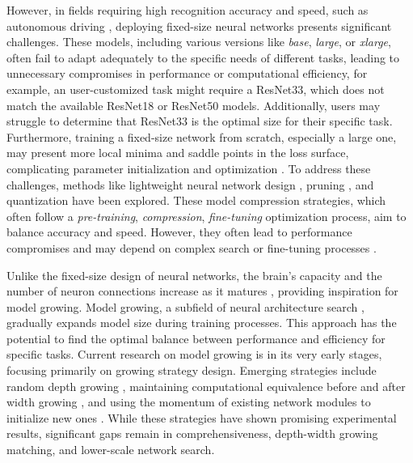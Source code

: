 \documentclass[preprint,12pt]{elsarticle}
\begin{document}
However, in fields requiring high recognition accuracy and speed, such as autonomous driving \cite{autodrive}, deploying fixed-size neural networks presents significant challenges. These models, including various versions like \textit{base}, \textit{large}, or \textit{xlarge}, often fail to adapt adequately to the specific needs of different tasks, leading to unnecessary compromises in performance or computational efficiency, for example, an user-customized task might require a ResNet33, which does not match the available ResNet18 or ResNet50 models. Additionally, users may struggle to determine that ResNet33 is the optimal size for their specific task. Furthermore, training a fixed-size network from scratch, especially a large one, may present more local minima and saddle points in the loss surface, complicating parameter initialization and optimization \cite{hardtrain}. To address these challenges, methods like lightweight neural network design \cite{lightweight}, pruning \cite{pruning}, and quantization \cite{quantization} have been explored. These model compression strategies, which often follow a \textit{pre-training}, \textit{compression}, \textit{fine-tuning} optimization process, aim to balance accuracy and speed. However, they often lead to performance compromises and may depend on complex search or fine-tuning processes \cite{finetuning}.

Unlike the fixed-size design of neural networks, the brain's capacity and the number of neuron connections increase as it matures \cite{brain}, providing inspiration for model growing. Model growing, a subfield of neural architecture search \cite{nas}, gradually expands model size during training processes. This approach has the potential to find the optimal balance between performance and efficiency for specific tasks. Current research on model growing is in its very early stages, focusing primarily on growing strategy design. Emerging strategies include random depth growing \cite{autogrow}, maintaining computational equivalence before and after width growing \cite{splitgrow}, and using the momentum of existing network modules to initialize new ones \cite{mogrow}. While these strategies have shown promising experimental results, significant gaps remain in comprehensiveness, depth-width growing matching, and lower-scale network search.
\end{document}
